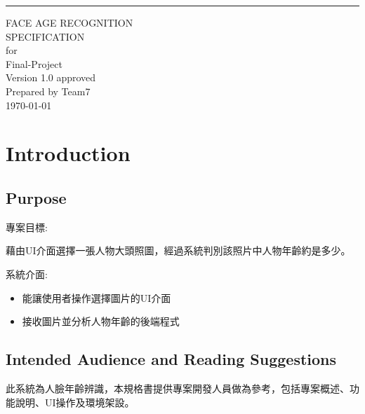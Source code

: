 \documentclass{scrreprt}
\date{}
\def\myversion{1.0 }
\begin{document}
\begin{CJK}{UTF8}{bkai}
\begin{flushright}
    \rule{16cm}{5pt}\vskip1cm
    \begin{bfseries}
        \Huge{FACE AGE RECOGNITION\\ SPECIFICATION}\\
        \vspace{1.9cm}
        for\\
        \vspace{1.9cm}
        Final-Project\\
        \vspace{1.9cm}
        \LARGE{Version \myversion approved}\\
        \vspace{1.9cm}
        Prepared by Team7\\
        \vspace{1.9cm}
        \today\\
    \end{bfseries}
\end{flushright}

\tableofcontents

\chapter{Introduction}

\section{Purpose}
\begin{description}
    \item 專案目標:
    \begin{description}
        \item 藉由UI介面選擇一張人物大頭照圖，經過系統判別該照片中人物年齡約是多少。
    \end{description}
    \item 系統介面:
    \begin{itemize}
        \item 能讓使用者操作選擇圖片的UI介面
        \item 接收圖片並分析人物年齡的後端程式
    \end{itemize}
\end{description}

\section{Intended Audience and Reading Suggestions}
此系統為人臉年齡辨識，本規格書提供專案開發人員做為參考，包括專案概述、功能說明、UI操作及環境架設。


\end{CJK}
\end{document}
